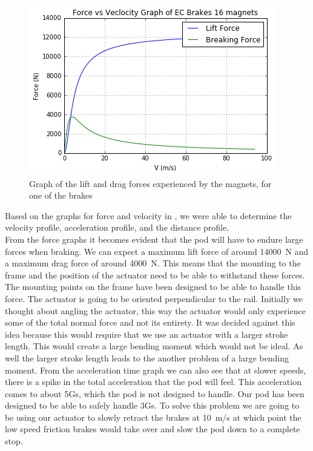 \documentclass[main.tex]{subfiles}
\begin{document}
    \begin{figure}
        \centering
        \includegraphics[width=\linewidth]{images/force_velocity_graph_16_magnets.png}
        \caption{Graph of the lift and drag forces experienced by the magnets, for one of the brakes}
        \label{fig:force-velocity-graph}
    \end{figure}
    Based on the graphs for force and velocity in , we were able to determine the velocity profile, acceleration profile, and the distance profile.\\
    From the force graphs it becomes evident that the pod will have to endure large forces when braking. We can expect a maximum lift force of around \SI{14000}{N} and a maximum drag force of around \SI{4000}{N}. This means that the mounting to the frame and the position of the actuator need to be able to withstand these forces. The mounting points on the frame have been designed to be able to handle this force. The actuator is going to be oriented perpendicular to the rail. Initially we thought about angling the actuator, this way the actuator would only experience some of the total normal force and not its entirety. It was decided against this idea because this would require that we use an actuator with a larger stroke length. This would create a large bending moment which would not be ideal. As well the larger stroke length leads to the another problem of a large bending moment.
    From the acceleration time graph we can also see that at slower speeds, there is a spike in the total acceleration that the pod will feel. This acceleration comes to about 5Gs, which the pod is not designed to handle. Our pod has been designed to be able to safely handle 3Gs. To solve this problem we are going to be using our actuator to slowly retract the brakes at \SI{10}{m/s} at which point the low speed friction brakes would take over and slow the pod down to a complete stop.\\
\end{document}
